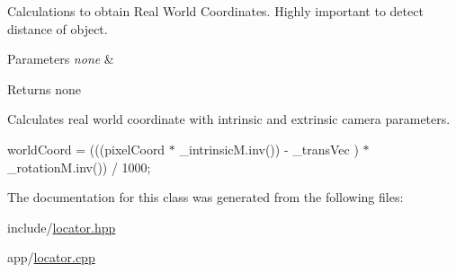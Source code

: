 Calculations to obtain Real World Coordinates. Highly important to detect distance of object. 


\begin{DoxyParams}{Parameters}
{\em none} & \\
\hline
\end{DoxyParams}
\begin{DoxyReturn}{Returns}
none 
\end{DoxyReturn}
Calculates real world coordinate with intrinsic and extrinsic camera parameters.

world\+Coord = (((pixel\+Coord $\ast$ \+\_\+intrinsic\+M.\+inv()) -\/ \+\_\+trans\+Vec ) $\ast$ \+\_\+rotation\+M.\+inv()) / 1000; 

The documentation for this class was generated from the following files\+:\begin{DoxyCompactItemize}
\item 
include/\hyperlink{locator_8hpp}{locator.\+hpp}\item 
app/\hyperlink{locator_8cpp}{locator.\+cpp}\end{DoxyCompactItemize}
